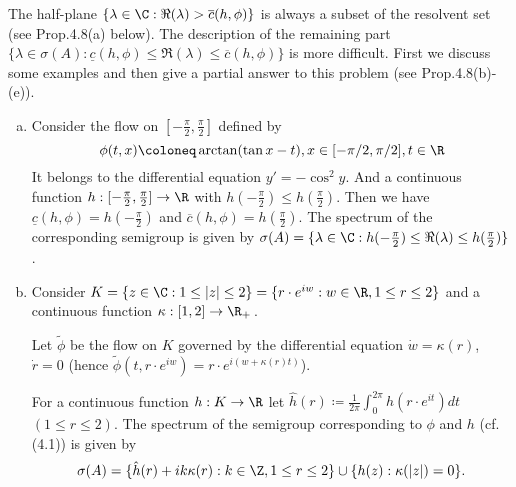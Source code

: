 The half-plane $\{\lambda \in \C : \Re(\lambda) > \overline{c}(h,\phi)\}$ is always a subset of the resolvent set (see Prop.4.8(a) below).
The description of the remaining part $\{\lambda \in \sigma(A) : \underline{c}(h,\phi) \leq \Re(\lambda) \leq \overline{c}(h,\phi)\}$ is more difficult.
First we discuss some examples and then give a partial answer to this problem (see Prop.4.8(b)-(e)).
%
\begin{example}\label{ex:b3-4.7}
	\begin{enumerate}[(a)]
		\item 
		Consider the flow on $[-\frac{\pi}{2},\frac{\pi}{2}]$ defined by
		\[
		\phi(t,x)\coloneq \arctan(\tan x - t) , x \in [-{\pi}/{2},{\pi}/{2}], 
		t \in \R
		\] 
		It belongs to the differential equation $y' = -\cos^2y$.  And a continuous function $h: [-\frac{\pi}{2},\frac{\pi}{2}] \to \R$ with $h(-\frac{\pi}{2}) \leq h(\frac{\pi}{2})$.
		Then we have $\underline{c}(h,\phi) = h(-\frac{\pi}{2})$ and $\overline{c}(h,\phi) = h(\frac{\pi}{2})$.
		The spectrum of the corresponding semigroup is given by $\sigma(A) = \{\lambda \in \C : h(-\frac{\pi}{2}) \leq \Re(\lambda) \leq h(\frac{\pi}{2})\}$.
		
		\item 
		Consider $K = \{z \in \C : 1 \leq |z| \leq 2\} = \{r\cdot e^{iw} : w \in \R, 1 \leq r \leq 2\}$ and a continuous function $\kappa: [1,2] \to \R_+$\,.
		
		Let $\tilde{\phi}$ be the flow on $K$ governed by the differential equation $\dot{w} = \kappa(r)$, $\dot{r} = 0$ (hence $\tilde{\phi}(t,r\cdot e^{iw}) = r\cdot e^{i(w+\kappa(r)t)}$).
		
		For a continuous function $h: K \to \R$ let $\hat{h}(r) \coloneq \frac{1}{2\pi}\int_{0}^{2\pi} h(r\cdot e^{it}) dt$ $(1 \leq r \leq 2)$.
		The spectrum of the semigroup corresponding to $\phi$ and $h$ (cf. (4.1)) is given by
		\[\sigma(A) = \{\hat{h}(r) + ik\kappa(r) : k \in \Z, 1 \leq r \leq 2\} \cup \{h(z) : \kappa(|z|) = 0\}.\]
	\end{enumerate}
\end{example}

